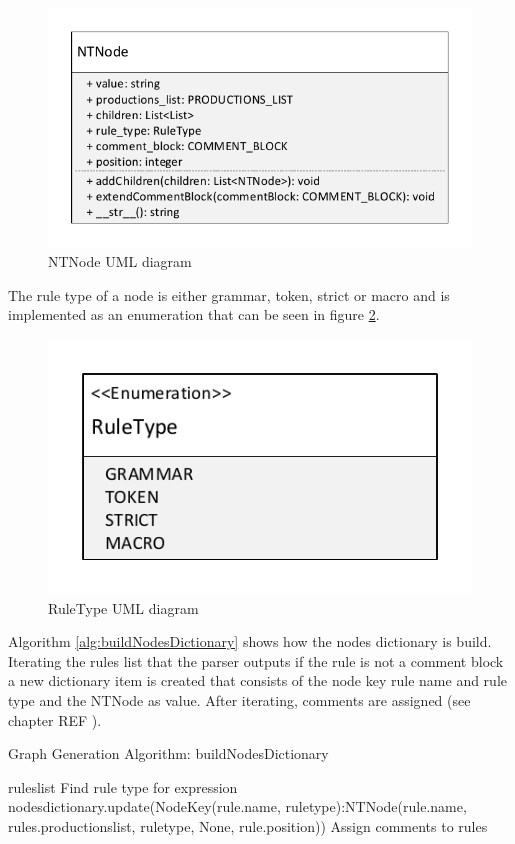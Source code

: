 \begin{figure}[H]
\centering
\includegraphics[width=1\textwidth]{images/uml_data_types_NTNode.pdf}
\caption{NTNode UML diagram}
\label{fig:ImplementationNTNodeUML}
\end{figure}

The rule type of a node is either grammar, token, strict or macro and is implemented as an enumeration that can be seen in figure \ref{fig:ImplementationRuleTypeUML}. 

\begin{figure}[H]
\centering
\includegraphics[width=.7\textwidth]{images/uml_data_types_rule_type.pdf}
\caption{RuleType UML diagram}
\label{fig:ImplementationRuleTypeUML}
\end{figure}

Algorithm \ref{alg:buildNodesDictionary} shows how the nodes dictionary is build. Iterating the rules list that the parser outputs if the rule is not a comment block a new dictionary item is created that consists of the node key rule name and rule type and the NTNode as value. After iterating, comments are assigned (see chapter REF ).

\begin{algorithm}[H]
\caption{Graph Generation Algorithm: buildNodesDictionary}\label{alg:buildNodesDictionary}
\begin{algorithmic}[1] 
\Require rules\textunderscore list
		\State Find rule type for expression
		\State nodes\textunderscore dictionary.update({Node\textunderscore Key(rule.name, rule\textunderscore type):NTNode(rule.name, rules.productions\textunderscore list, rule\textunderscore type, None, rule.position)})
	\EndIf
\EndFor
\State Assign comments to rules
\end{algorithmic}
\end{algorithm}

